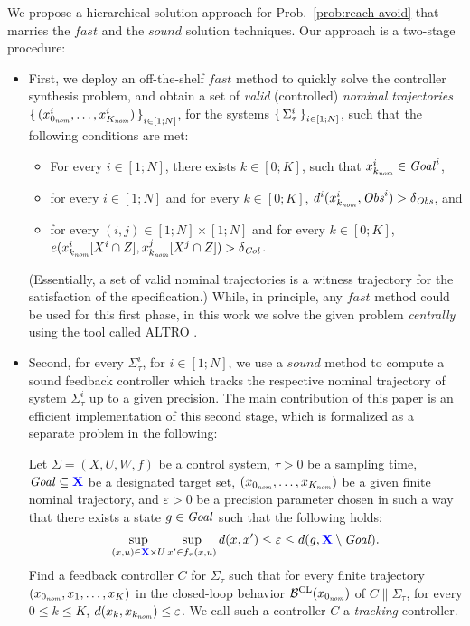 We propose a hierarchical solution approach for Prob.~\ref{prob:reach-avoid} that marries the $\mathit{fast}$ and the $\mathit{sound}$ solution techniques.
Our approach is a two-stage procedure: 
\begin{itemize}
	\item First, we deploy an off-the-shelf $\mathit{fast}$ method to quickly solve the controller synthesis problem, and obtain a set of  \emph{valid} (controlled) \emph{nominal trajectories} $\set{(x_{0_{\mathit{nom}}}^i,\ldots,x_{K_{\mathit{nom}}}^i)}_{i\in [1;N]}$, for the systems $\set{\Sigma_\tau^i}_{i\in [1;N]}$, such that the following conditions are met:
	\begin{itemize}
		\item For every $i\in [1;N]$, there exists $k\in [0;K]$, such that $x_{k_{\mathit{nom}}}^i\in \mathit{Goal}^i$,
		\item for every $i\in [1;N]$ and for every $k\in [0;K]$, $d^i(x_{k_{\mathit{nom}}}^i,\mathit{Obs}^i) > \delta_{\mathit{Obs}}$, and
		\item for every $(i,j)\in [1;N]\times [1;N]$ and for every $k\in [0;K]$, $e(x_{k_{\mathit{nom}}}^i[X^i\cap Z], x_{k_{\mathit{nom}}}^j[X^j\cap Z]) > \delta_{\mathit{Col}}$.
	\end{itemize}
	(Essentially, a set of valid nominal trajectories is a witness trajectory for the satisfaction of the specification.)
	While, in principle, any $\mathit{fast}$ method could be used for this first phase, in this work we solve the given problem \emph{centrally} using the tool called ALTRO \cite{howell2019altro}.
	\item Second, for every $\Sigma^i_\tau$, for $i\in [1;N]$, we use a $\mathit{sound}$ method to compute a sound feedback controller which tracks the respective nominal trajectory of system $\Sigma^i_\tau$ up to a given precision.
The main contribution of this paper is an efficient implementation of this second stage, which is formalized as a separate problem in the following:
		\begin{problem}\label{prob:tracking_with_time}
			Let $\Sigma=(X,U,W,f)$ be a control system, $\tau>0$ be a sampling time, $\mathit{Goal}\subseteq {\color{blue} \mathbf{X}}$ be a designated target set, $(x_{0_{\mathit{nom}}},\ldots,x_{K_{\mathit{nom}}})$ be a given finite nominal trajectory, and $\varepsilon>0$ be a precision parameter chosen in such a way that there exists a state $g\in \mathit{Goal}$ such that the following holds:
			\begin{equation}\label{eq:choice of eps}
				\sup_{(x,u)\in {\color{blue} \mathbf{X}}\times U} \sup_{x'\in f_\tau(x,u)} d(x,x')	\leq \varepsilon \leq d(g, {\color{blue} \mathbf{X}}\setminus \mathit{Goal}). 
			\end{equation}
			Find a feedback controller $C$ for $\Sigma_\tau$ such that 
			for every finite trajectory $(x_{0_{\mathit{nom}}},x_1,\ldots,x_K)$ in the closed-loop behavior $\mathcal{B}^{\mathrm{CL}}(x_{0_{\mathit{nom}}})$ of $C \parallel \Sigma_\tau$, for every $0\leq k \leq K$, $d(x_k, x_{k_{\mathit{nom}}}) \leq \varepsilon$.
			We call such a controller $C$ a \emph{tracking} controller.
		\end{problem}
\end{itemize}

